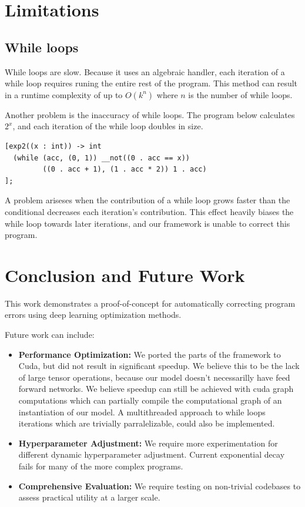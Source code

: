 \documentclass{article}
\begin{document}
\section{Limitations}
\subsection{While loops}
While loops are slow. Because it uses an algebraic handler, each iteration of a while loop requires runing the entire rest of the program. This method can result in a runtime complexity of up to $O(k^n)$ where $n$ is the number of while loops.

Another problem is the inaccuracy of while loops. The program below calculates $2^x$, and each iteration of the while loop doubles in size.
\begin{verbatim}
[exp2((x : int)) -> int
  (while (acc, (0, 1)) __not((0 . acc == x))
         ((0 . acc + 1), (1 . acc * 2)) 1 . acc)
];
\end{verbatim}
A problem ariseses when the contribution of a while loop grows faster than the conditional decreases each iteration's contribution. This effect heavily biases the while loop towards later iterations, and our framework is unable to correct this program.

\section{Conclusion and Future Work}
This work demonstrates a proof-of-concept for automatically correcting program errors using deep learning optimization methods.

Future work can include:
\begin{itemize}
\item \textbf{Performance Optimization:} We ported the parts of the framework to Cuda, but did not result in significant speedup. We believe this to be the lack of large tensor operations, because our model doesn't necessarilly have feed forward networks. We believe speedup can still be achieved with cuda graph computations which can partially compile the computational graph of an instantiation of our model. A multithreaded approach to while loops iterations which are trivially parralelizable, could also be implemented.
\item \textbf{Hyperparameter Adjustment:} We require more experimentation for different dynamic hyperparameter adjustment. Current exponential decay fails for many of the more complex programs.
\item \textbf{Comprehensive Evaluation:} We require testing on non-trivial codebases to assess practical utility at a larger scale.
\end{itemize}



\end{document}
